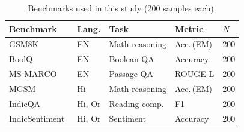 \begin{table}[t]
\centering
\caption{Benchmarks used in this study (200 samples each).}
\label{tab:benchmarks}
\small
\begin{tabular}{lllll}
\toprule
\textbf{Benchmark} & \textbf{Lang.} & \textbf{Task} & \textbf{Metric} & $N$ \\
\midrule
GSM8K~\cite{cobbe2021gsm8k}                  & EN     & Math reasoning & Acc.\,(EM)  & 200 \\
BoolQ~\cite{clark2019boolq}                  & EN     & Boolean QA     & Accuracy    & 200 \\
MS MARCO~\cite{nguyen2016ms}                 & EN     & Passage QA     & ROUGE-L     & 200 \\
MGSM~\cite{shi2023language}                  & Hi     & Math reasoning & Acc.\,(EM)  & 200 \\
IndicQA~\cite{doddapaneni2023towards}        & Hi, Or & Reading comp.  & F1          & 200 \\
IndicSentiment~\cite{doddapaneni2023towards} & Hi, Or & Sentiment      & Accuracy    & 200 \\
\bottomrule
\end{tabular}
\end{table}


